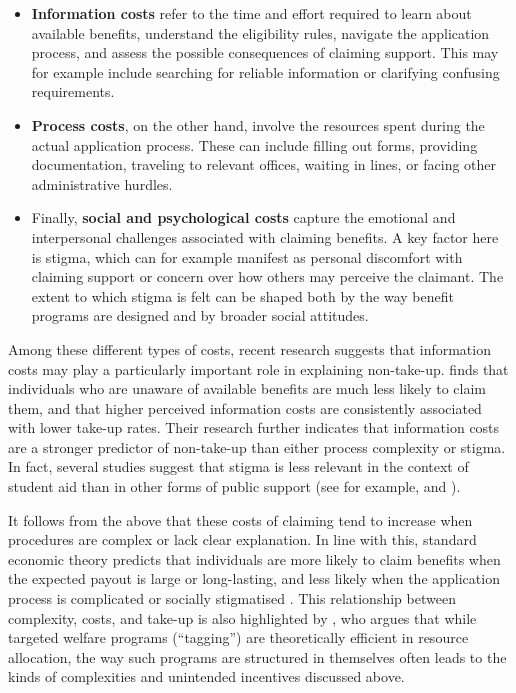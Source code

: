 \begin{itemize}
  \item \textbf{Information costs} refer to the time and effort required to learn about available benefits, understand the eligibility rules, navigate the application process, and assess the possible consequences of claiming support. This may for example include searching for reliable information or clarifying confusing requirements.
  \item \textbf{Process costs}, on the other hand, involve the resources spent during the actual application process. These can include filling out forms, providing documentation, traveling to relevant offices, waiting in lines, or facing other administrative hurdles.
  \item Finally, \textbf{social and psychological costs} capture the emotional and interpersonal challenges associated with claiming benefits. A key factor here is stigma, which can for example manifest as personal discomfort with claiming support or concern over how others may perceive the claimant. The extent to which stigma is felt can be shaped both by the way benefit programs are designed and by broader social attitudes.
\end{itemize}

Among these different types of costs, recent research suggests that information costs may play a particularly important role in explaining non-take-up. \cite{bolland_information_nodate} finds that individuals who are unaware of available benefits are much less likely to claim them, and that higher perceived information costs are consistently associated with lower take-up rates. Their research further indicates that information costs are a stronger predictor of non-take-up than either process complexity or stigma. In fact, several studies suggest that stigma is less relevant in the context of student aid than in other forms of public support (see for example, \cite{konijn_quantifying_2023} and \cite{bruckmeier_new_2012}).

It follows from the above that these costs of claiming tend to increase when procedures are complex or lack clear explanation. In line with this, standard economic theory predicts that individuals are more likely to claim benefits when the expected payout is large or long-lasting, and less likely when the application process is complicated or socially stigmatised \citep{janssens_totake_2022, booij_role_2012}. This relationship between complexity, costs, and take-up is also highlighted by \cite{akerlof_tagging_1978}, who argues that while targeted welfare programs (“tagging”) are theoretically efficient in resource allocation, the way such programs are structured in themselves often leads to the kinds of complexities and unintended incentives discussed above.

